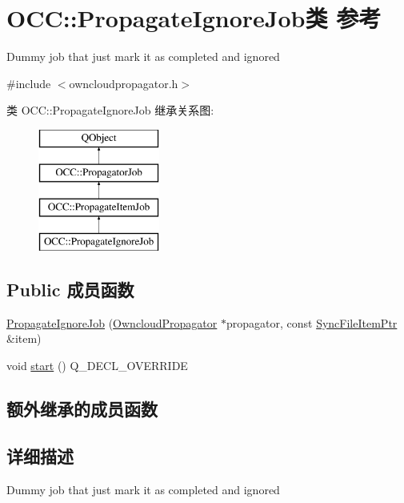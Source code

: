 \hypertarget{class_o_c_c_1_1_propagate_ignore_job}{}\section{O\+CC\+:\+:Propagate\+Ignore\+Job类 参考}
\label{class_o_c_c_1_1_propagate_ignore_job}


Dummy job that just mark it as completed and ignored  




{\ttfamily \#include $<$owncloudpropagator.\+h$>$}

类 O\+CC\+:\+:Propagate\+Ignore\+Job 继承关系图\+:\begin{figure}[H]
\begin{center}
\leavevmode
\includegraphics[height=4.000000cm]{class_o_c_c_1_1_propagate_ignore_job}
\end{center}
\end{figure}
\subsection*{Public 成员函数}
\begin{DoxyCompactItemize}
\item 
\hyperlink{class_o_c_c_1_1_propagate_ignore_job_a7c9519a8703a23c232bc5ff006ea86d3}{Propagate\+Ignore\+Job} (\hyperlink{class_o_c_c_1_1_owncloud_propagator}{Owncloud\+Propagator} $\ast$propagator, const \hyperlink{namespace_o_c_c_acb6b0db82893659fbd0c98d3c5b8e2b8}{Sync\+File\+Item\+Ptr} \&item)
\item 
void \hyperlink{class_o_c_c_1_1_propagate_ignore_job_ab4b6fd1aeabf3279ac136719dc3cf6fb}{start} () Q\+\_\+\+D\+E\+C\+L\+\_\+\+O\+V\+E\+R\+R\+I\+DE
\end{DoxyCompactItemize}
\subsection*{额外继承的成员函数}


\subsection{详细描述}
Dummy job that just mark it as completed and ignored 

